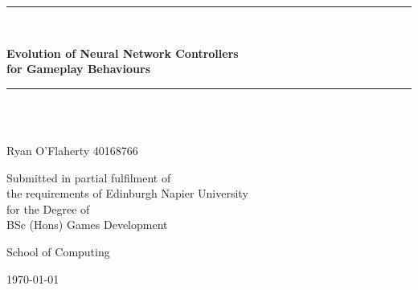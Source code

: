 \newcommand{\HRule}{\rule{\linewidth}{0.5mm}}

\begin{titlepage}
	\begin{center}

	\HRule \\[0.4cm]
    	{\Large \bfseries Evolution of Neural Network Controllers\\for Gameplay Behaviours\par}
	\vspace{0.2cm}
	\HRule \\[1.5cm] 

	
    	\vspace{3cm}
	\begin{minipage}{0.4\textwidth}
	\begin{center} \large
        \emph{}\\
        	Ryan O'Flaherty 40168766
				
   	 \end{center}
    	\end{minipage}
	
	\vspace{2cm}
    	\begin{minipage}{1\textwidth}
    	\begin{center} \large
        
		Submitted in partial fulfilment of \\
		the requirements of Edinburgh Napier University \\
		for the Degree of \\
        	BSc (Hons) Games Development
    	\end{center}
    	\end{minipage}

    	\vfill

	\begin{minipage}{1\textwidth}
    	\begin{center} \large
		School of Computing
    	\end{center}
    	\end{minipage}
	
	\vspace{1cm}
    	{\large \today}


	\end{center}
\end{titlepage}
